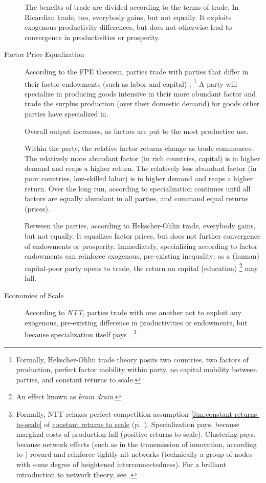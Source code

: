 \begin{description}
	The benefits of trade are divided according to the terms of trade.
	In Ricardian trade, too, everybody gains, but not equally.
It exploits exogenous productivity differences, but does not otherwise lead to convergence in productivities or prosperity.


	\item[Factor Price Equalization] \label{itm:FPE} According to the \gls{FPE} theorem, parties trade with parties that differ in their factor endowments (such as labor and capital) \citep{Stolper1941}.
	\footnote{
		Formally, Hekscher-Ohlin trade theory posits two countries, two factors of production, perfect factor mobility within party, no capital mobility between parties, and constant returns to scale.
	}
A party will specialize in producing goods intensive in their more abundant factor and trade the surplus production (over their domestic demand) for goods other parties have specialized in.

	Overall output increases, as factors are put to the most productive use.

	Within the party, the relative factor returns change as trade commences.
The relatively more abundant factor (in rich countries, capital) is in higher demand and reaps a higher return.
The relatively less abundant factor (in poor countries, low-skilled labor) is in higher demand and reaps a higher return.
Over the long run, according to \cite{Stolper1941} specialization continues until all factors are equally abundant in all parties, and command equal returns (prices).

	Between the parties, according to Hekscher-Ohlin trade, everybody gains, but not equally.
It equalizes factor prices, but does not further convergence of endowments or prosperity.
Immediately, specializing according to factor endowments can reinforce exogenous, pre-existing inequality:
as a (human) capital-poor party opens to trade, the return on capital (education)
\footnote{
	An effect known as \emph{brain drain}.
}
may fall.

	\item[Economies of Scale] \label{itm:NTT} According to \emph{\gls{NTT}}, parties trade with one another not to exploit any exogenous, pre-existing difference in productivities or endowments, but because specialization itself pays \citep{Krugman-1980-aa}.
	\footnote{
		Formally, \gls{NTT} relaxes perfect competition assumption \ref{itm:constant-returns-to-scale} of \hyperref[itm:constant-returns-to-scale]{constant returns to scale} (p.~\pageref{itm:constant-returns-to-scale}).
		Specialization pays, because marginal costs of production fall (positive returns to scale).
		Clustering pays, because network effects (such as in the transmission of innovation, according to \citealt{Bass1969}) reward and reinforce tightly-nit networks (technically a group of nodes with some degree of heightened interconnectedness).
		For a brilliant introduction to network theory, see \cite{Kleinberg-2009-oz}.
	}


\end{description}
